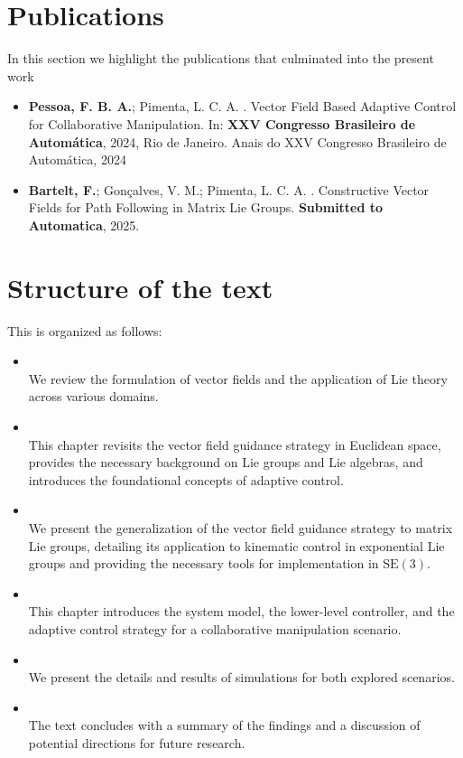 \section{Publications}
In this section we highlight the publications that culminated into the present work
\begin{itemize}
    \item \textbf{Pessoa, F. B. A.}; Pimenta, L. C. A. . Vector Field Based Adaptive Control for Collaborative Manipulation. In: \textbf{XXV Congresso Brasileiro de Automática}, 2024, Rio de Janeiro. Anais do XXV Congresso Brasileiro de Automática, 2024
    \item \textbf{Bartelt, F.}; Gonçalves, V. M.; Pimenta, L. C. A. . Constructive Vector Fields for Path Following in Matrix Lie Groups. \textbf{Submitted to Automatica}, 2025.
\end{itemize}
\section{Structure of the text}
This  is organized as follows:
\begin{itemize}
    \item {}\\
    We review the formulation of vector fields and the application of Lie theory across various domains.
    \item {}\\
    This chapter revisits the vector field guidance strategy in Euclidean space, provides the necessary background on Lie groups and Lie algebras, and introduces the foundational concepts of adaptive control.
    \item {}\\
    We present the generalization of the vector field guidance strategy to matrix Lie groups, detailing its application to kinematic control in exponential Lie groups and providing the necessary tools for implementation in $\text{SE}(3)$.
    \item {}\\
    This chapter introduces the system model, the lower-level controller, and the adaptive control strategy for a collaborative manipulation scenario.
    \item {}\\
    We present the details and results of simulations for both explored scenarios.
    \item {}\\
    The text concludes with a summary of the findings and a discussion of potential directions for future research.
\end{itemize}

